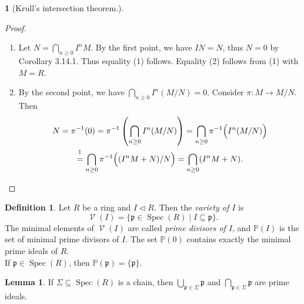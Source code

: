 \documentclass[12pt,a4paper]{report}
\theoremstyle{definition}
\newtheorem{lemma}[theorem]{Lemma}
\newtheorem{defn}[theorem]{Definition}
\theoremstyle{num.custom-title}
\newtheorem{teo_custom-title}[theorem]{} %
\newenvironment{claim}[1]{\par\noindent\underline{Claim#1:}\space}{} %
\DeclareMathOperator{\V}{\mathcal{V}}
\DeclareMathOperator{\sse}{\subseteq}
\DeclareMathOperator{\Spec}{Spec}
\newcommand{\p}{\mathfrak{p}}
\renewcommand{\P}{\mathbb{P}}
\begin{document}
\begin{teo_custom-title}[Krull's intersection theorem.]
\begin{proof}
\begin{enumerate}
\begin{claim}{}
\end{claim}\ \\
So we have $N \sse I^n M \sse L$, and thus $N \sse I^n M \cap N \sse L \cap N = IN \sse N$, i.e. $N=IN$.
\item Let $N = \bigcap_{n \geq 0} I^nM$. By the first point, we have $IN=N$, thus $N=0$ by Corollary 3.14.1. Thus equality (1) follows. Equality (2) follows from (1) with $M=R$.
\item By the second point, we have $\bigcap_{n \geq 0} I^n (M/N) = 0$. Consider $\pi : M \to M/N$. Then
\begin{multline*}
N = \pi^{-1}(0) = \pi^{-1} \left( \bigcap_{n \geq 0} I^n (M/N) \right) = \bigcap_{n \geq 0} \pi^{-1} \Big( I^n (M/N) \Big)\\
\stackrel{\footnotemark}{=} \bigcap_{n \geq 0} \pi^{-1} \Big( (I^n M + N)/N \Big) = \bigcap_{n \geq 0} (I^n M + N).
\end{multline*}
\end{enumerate}
\end{proof}
\end{teo_custom-title}

\begin{defn}
Let $R$ be a ring and $I \lhd R$. Then the \emph{variety of $I$} is
\[
\V(I) = \{ \p \in \Spec(R) \mid I \sse \p \}.
\]
The minimal elements of $\V(I)$ are called \emph{prime divisors of $I$}, and $\P(I)$ is the set of minimal prime divisors of $I$. The set $\P(0)$ contains exactly the minimal prime ideals of $R$.\\
If $\p \in \Spec(R)$, then $\P(\p)=\{\p\}$.
\end{defn}

\begin{lemma}
If $\Sigma \sse \Spec(R)$ is a chain, then $\bigcup_{\p \in \Sigma} \p$ and $\bigcap_{\p \in \Sigma} \p$ are prime ideals.
\end{lemma}
\end{document}
